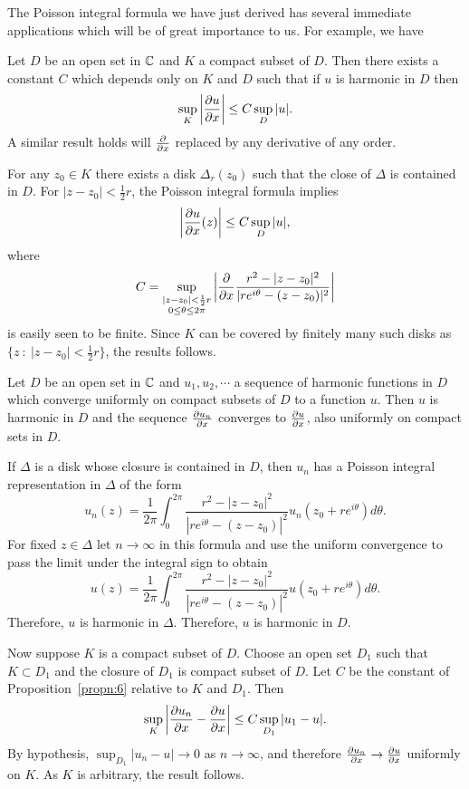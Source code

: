\documentclass[a4paper,11pt]{article}
\begin{document}
The Poisson integral formula we have just derived has several
immediate applications which will be of great importance to us.  For
example, we have 

\begin{propn}
  \label{propn:6}
  Let $D$ be an open set in ${\mathbb C}$ and $K$ a compact subset of $D$.
  Then there exists a constant $C$ which depends only on $K$ and $D$
  such that if $u$ is harmonic in $D$ then
  $$
  \sup_K \left|\frac{\partial u}{\partial x}\right|
  \le C \sup_D |u|.
  $$
  A similar result holds will $\frac{\partial}{\partial x}$ replaced by any
  derivative of any order.
\end{propn}

\begin{myproof}
  For any $z_0 \in K$ there exists a disk $\Delta_r(z_0)$ such that
  the close of $\Delta$ is contained in $D$.  For $|z-z_0| <
  \frac{1}{2}r$, the Poisson integral formula implies
  $$
  \left|\frac{\partial u}{\partial x}(z)\right| \le C \sup_D |u|,
  $$
  where
  $$
  C = \sup_{\substack{|z-z_0|<\frac{1}{2}r\\ 0\le \theta \le 2\pi}}
  \left|\frac{\partial}{\partial x} \frac{r^2-|z-z_0|^2}{
      |re^{i\theta} - (z-z_0)|^2}\right|
  $$
  is easily seen to be finite.  Since $K$ can be covered by finitely
  many such disks as $\{z ~:~ |z-z_0| < \frac{1}{2}r\}$, the results
  follows.
\end{myproof}

\begin{propn}
  \label{propn:7}
  Let $D$ be an open set in ${\mathbb C}$ and $u_1, u_2, \cdots$ a sequence
  of harmonic functions in $D$ which converge uniformly on compact
  subsets of $D$ to a function $u$.  Then $u$ is harmonic in $D$ and
  the sequence $\frac{\partial u_n}{\partial x}$ converges to $\frac{\partial u}{\partial x}$,
  also uniformly on compact sets in $D$.
\end{propn}

\begin{myproof}
  If $\Delta$ is a disk whose closure is contained in $D$, then $u_n$
  has a Poisson integral representation in $\Delta$ of the form
  $$
  u_n(z) = \frac{1}{2\pi} \int_0^{2\pi} \frac{r^2 - |z-z_0|^2}{
  |re^{i\theta} - (z-z_0)|^2} u_n(z_0 + re^{i\theta}) d\theta.
  $$
  For fixed $z \in \Delta$ let $n\to \infty$ in this formula and use
  the uniform convergence to pass the limit under the integral sign to
  obtain
  $$
  u(z) = \frac{1}{2\pi} \int_0^{2\pi} \frac{r^2 - |z-z_0|^2}{
  |re^{i\theta} - (z-z_0)|^2} u(z_0 + re^{i\theta}) d\theta.
  $$
  Therefore, $u$ is harmonic in $\Delta$.  Therefore, $u$ is harmonic
  in $D$.

  Now suppose $K$ is a compact subset of $D$.  Choose an open set
  $D_1$ such that $K \subset D_1$ and the closure of $D_1$ is compact
  subset of $D$.  Let $C$ be the constant of Proposition~\ref{propn:6}
  relative to $K$ and $D_1$.  Then
  $$
  \sup_K \left|\frac{\partial u_n}{\partial x} - \frac{\partial u}{\partial x}\right|
  \le C \sup_{D_1} |u_1 - u|.
  $$
  By hypothesis, $\sup_{D_1}|u_n-u| \to 0$ as $n \to \infty$, and
  therefore $\frac{\partial u_n}{\partial x} \to \frac{\partial u}{\partial x}$ uniformly on
  $K$.  As $K$ is arbitrary, the result follows.
\end{myproof}
\end{document}
